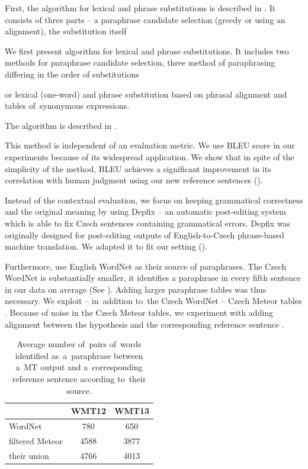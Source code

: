 First, the algorithm for lexical and phrase substitutions is described in .
It consists of three parts -- a paraphrase candidate selection (greedy or using an alignment),
the substitution itself



We first present algorithm for lexical and phrase substitutions. It includes two methods
for paraphrase candidate selection, three method of paraphrasing differing in the order
of substitutions


or lexical (one-word) and phrase 
substitution based on phrasal alignment and tables of~synonymous 
expressions. 

The algorithm is described in .

This method is independent of an evaluation metric. We use BLEU score in our 
experiments because of its widespread application.  We show that in spite of the 
simplicity of the method, BLEU achieves a significant improvement in its 
correlation with human judgment using our new reference sentences ().

Instead of the contextual evaluation, we focus on keeping grammatical 
correctness and the original meaning by using Depfix \citep{depfix} -- an 
automatic post-editing system which is able to fix Czech sentences containing 
grammatical errors. Depfix was originally designed for post-editing outputs of 
English-to-Czech phrase-based machine translation. We adapted it to fit our 
setting ().

Furthermore, \citet{kauchak} use English WordNet as their source of paraphrases.
The Czech WordNet \citep{czech-wordnet} is substantially smaller, it identifies a
paraphrase in every fifth sentence in our data on average (See 
). Adding larger paraphrase tables was thus necessary.
We exploit --  in~addition to~the Czech WordNet --  Czech Meteor tables 
\citep{meteor-tables}.  Because of noise in the Czech Meteor tables, we 
experiment with adding alignment between the hypothesis and the corresponding 
reference sentence .


\begin{table}[t]
\begin{center}
\begin{tabular}{l|cc}
& WMT12 & WMT13 \\
\hline
WordNet            &  780 & 650 \\
filtered Meteor    & 4588 & 3877 \\
their union        & 4766 & 4013 \\
\end{tabular}
\caption{Average number of~pairs of~words identified as~a~paraphrase between 
a~MT output and a~corresponding reference sentence according to~their source.}
\label{number_of_substitutions}
\end{center}
\end{table}

